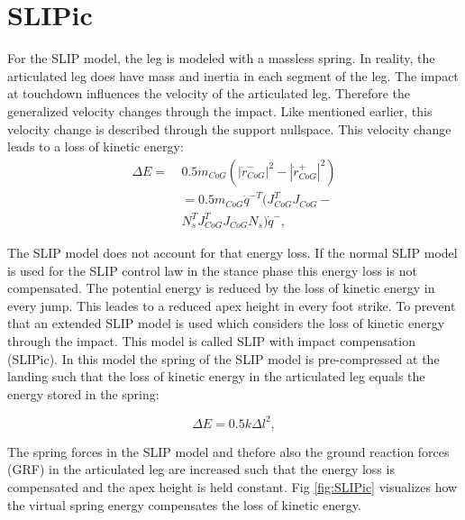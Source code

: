 \documentclass[10pt,conference]{IEEEtran}
\begin{document}
\section{SLIPic}
\label{sec:SLIPic}
For the SLIP model, the leg is modeled with a massless spring. In reality, the articulated leg does have mass and inertia in each segment of the leg. 
The impact at touchdown influences the velocity of the articulated leg. Therefore the generalized velocity changes through the impact. 
Like mentioned earlier, this velocity change is described through the support nullspace. This velocity change leads to a loss of kinetic energy:
\begin{equation}
\begin{aligned}
   \Delta E = & \ 0.5 {m}_{CoG} ({|{\dot{r}}_{CoG}^{-}|}^{2} - {|{\dot{r}}_{CoG}^{+}|}^{2}) \\
   & \ =0.5 {m}_{CoG} {\dot{q}}^{-T} ({J}_{CoG}^{T} {J}_{CoG} - \\
   & \ {N}_{s}^{T} {J}_{CoG}^{T} {J}_{CoG} {N}_{s}) {\dot{q}}^{-},
\end{aligned}
\end{equation}

The SLIP model does not account for that energy loss. If the normal SLIP model is used for the SLIP 
control law in the stance phase this energy loss is not compensated. The potential energy is reduced by the loss of kinetic energy in every jump. This leades to a reduced apex height 
in every foot strike. To prevent that an extended SLIP model is used which considers the loss of kinetic energy through the impact. This model is called SLIP with impact compensation 
(SLIPic). In this model the spring of the SLIP model is pre-compressed at the landing such that the loss of kinetic energy in the articulated leg equals the energy stored in the spring: 

\begin{equation}
   \Delta E = 0.5 k {\Delta l}^{2},
\end{equation}

The spring forces in the SLIP model and thefore also the ground reaction forces (GRF) in the articulated leg are increased such that the energy loss is compensated and the apex height is 
held constant. Fig \ref{fig:SLIPic} visualizes how the virtual spring energy compensates the loss of kinetic energy.
\end{document}
